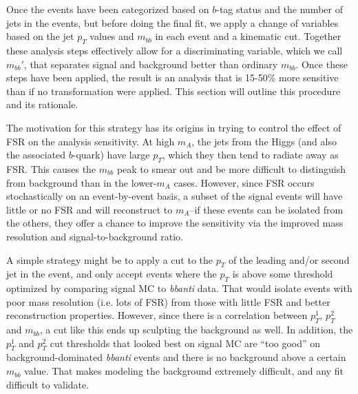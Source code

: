
Once the events have been categorized based on $b$-tag status and the number of jets in the
events, but before doing the final fit, we apply a change of variables based on the jet
$p_T$ values and $m_{bb}$ in each event and a kinematic cut.  Together these analysis 
steps effectively allow for a discriminating variable, which we call $m_{bb}'$, that
separates signal and background better than ordinary $m_{bb}$.  Once these steps have
been applied, the result is an analysis that is 15-50\% more sensitive
than if no transformation were applied.  This section will 
outline this procedure and its rationale.  

The motivation for this strategy has its origins in trying to control the effect of
FSR on the analysis sensitivity.  At high $m_A$, the jets from the Higgs (and also 
the associated $b$-quark) have large $p_T$, which they then tend to radiate away 
as FSR.  This causes the $m_{bb}$ peak to smear out and be more difficult to 
distinguish from background than in the lower-$m_A$ cases.  However, since FSR
occurs stochastically on an event-by-event basis, a subset of the signal events
will have little or no FSR and will reconstruct to $m_A$--if these events 
can be isolated from the others, they offer a chance to improve the sensitivity
via the improved mass resolution and signal-to-background ratio. 

A simple strategy might be to apply a cut to the $p_T$ of the leading and/or 
second jet in the event, and only accept events where the $p_T$ is above some
threshold optimized by comparing signal MC to \textit{bbanti} data.  
That would isolate events with poor mass resolution (i.e. lots of FSR) from
those with little FSR and better reconstruction properties.  However, since
there is a correlation between $p_T^1$, $p_T^2$ and $m_{bb}$, a cut like
this ends up sculpting the background as well.  In addition, the $p_T^1$ and
$p_T^2$ cut thresholds that looked best on signal MC are ``too good'' on 
background-dominated \textit{bbanti} events and there is no background
above a certain $m_{bb}$ value.  That makes modeling the background extremely 
difficult, and any fit difficult to validate.  

